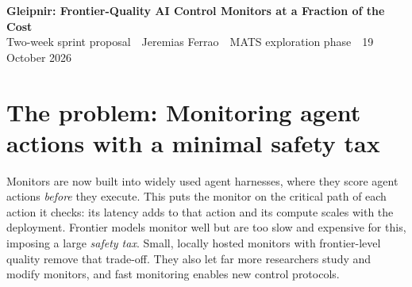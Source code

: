 \documentclass[10pt]{article}
\begin{document}
{\Large\bfseries\color{accent} Gleipnir: Frontier-Quality AI Control Monitors at a Fraction of the Cost}\\[2pt]
{\normalsize Two-week sprint proposal \,\textbar\, Jeremias Ferrao \,\textbar\, MATS exploration phase \,\textbar\, 19 October 2026}

\vspace{-4pt}
\section{The problem: Monitoring agent actions with a minimal safety tax}
Monitors are now built into widely used agent harnesses, where they score agent actions \emph{before} they execute. This
puts the monitor on the critical path of each action it checks: its latency adds to that action and its compute
scales with the deployment. Frontier models monitor well but are too slow and expensive for this, imposing a
large \emph{safety tax}. Small, locally hosted monitors with frontier-level quality remove that trade-off. They also
let far more researchers study and modify monitors, and fast monitoring enables new control protocols.
\end{document}
